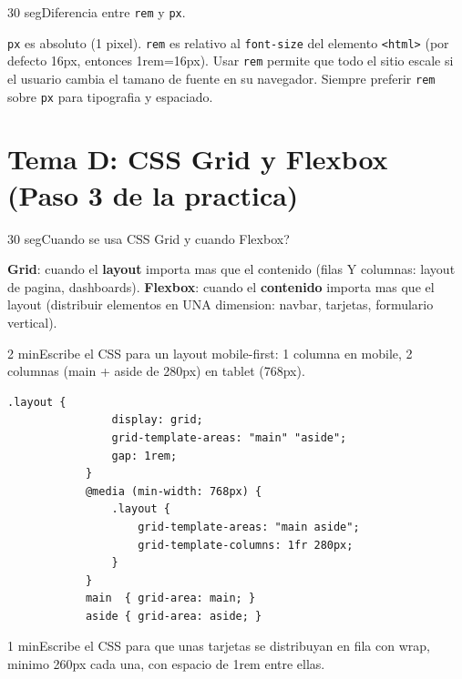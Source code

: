 \documentclass[11pt,a4paper]{article}
\newcounter{nej}
\newcommand{\ej}[2]{%
	\stepcounter{nej}%
	\begin{ejercicio}{\arabic{nej}}{#1}#2\end{ejercicio}\vspace{4pt}}
\begin{document}
	\ej{30 seg}{Diferencia entre \texttt{rem} y \texttt{px}.}
	
	\begin{respuesta}
		\texttt{px} es absoluto (1 pixel). \texttt{rem} es relativo al \texttt{font-size} del elemento \texttt{<html>} (por defecto 16px, entonces 1rem=16px). Usar \texttt{rem} permite que todo el sitio escale si el usuario cambia el tamano de fuente en su navegador. Siempre preferir \texttt{rem} sobre \texttt{px} para tipografia y espaciado.
	\end{respuesta}
	\vspace{6pt}
	
	\section{Tema D: CSS Grid y Flexbox (Paso 3 de la practica)}
	
	\ej{30 seg}{Cuando se usa CSS Grid y cuando Flexbox?}
	
	\begin{respuesta}
		\textbf{Grid}: cuando el \textbf{layout} importa mas que el contenido (filas Y columnas: layout de pagina, dashboards). \textbf{Flexbox}: cuando el \textbf{contenido} importa mas que el layout (distribuir elementos en UNA dimension: navbar, tarjetas, formulario vertical).
	\end{respuesta}
	\vspace{6pt}
	
	\ej{2 min}{Escribe el CSS para un layout mobile-first: 1 columna en mobile, 2 columnas (main + aside de 280px) en tablet (768px).}
	
	\begin{respuesta}
		\begin{lstlisting}[style=codecss]
			.layout {
				display: grid;
				grid-template-areas: "main" "aside";
				gap: 1rem;
			}
			@media (min-width: 768px) {
				.layout {
					grid-template-areas: "main aside";
					grid-template-columns: 1fr 280px;
				}
			}
			main  { grid-area: main; }
			aside { grid-area: aside; }
		\end{lstlisting}
	\end{respuesta}
	\vspace{6pt}
	
	\ej{1 min}{Escribe el CSS para que unas tarjetas se distribuyan en fila con wrap, minimo 260px cada una, con espacio de 1rem entre ellas.}
	
\end{document}
